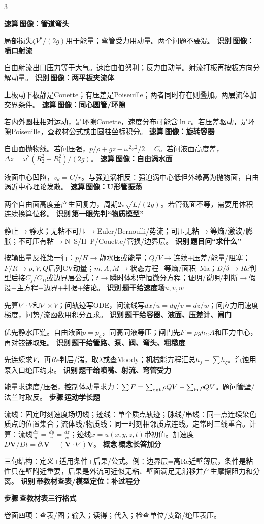 \documentclass[a4paper]{article}
\newcommand{\labtag}[3]{{\bfseries\color{#1}\colorbox{#1}{\color{white}\fontsize{2.35}{2.48}\selectfont #2}\,#3}\par}
\newcommand{\iden}[1]{\labtag{C}{识别}{#1}}
\newcommand{\step}[1]{\labtag{S}{步骤}{#1}}
\newcommand{\concept}[1]{\labtag{V}{概念}{#1}}
\newcommand{\idq}[1]{\iden{#1}}
\newcommand{\stepq}[1]{\step{#1}}
\newcommand{\conceptq}[1]{\concept{#1}}
\newcommand{\quickq}[1]{\labtag{F}{速算}{#1}}
\newenvironment{vfourWrap}{\par\begingroup\fontsize{2.68}{2.84}\selectfont\setlength{\fboxsep}{0.45pt}}{\par\endgroup}
\begin{document}
\begin{multicols}{3}
\begin{vfourWrap}
\quickq{图像：管道弯头}
局部损失$\zeta V^2/(2g)$用于能量；弯管受力用动量。两个问题不要混。
\idq{图像：喷口射流}
自由射流出口压力等于大气。速度由伯努利；反力由动量。射流打板再按板方向分解动量。
\idq{图像：两平板夹流体}
上板动下板静是Couette；有压差是Poiseuille；两者同时存在则叠加。两层流体加交界条件。
\quickq{图像：同心圆管/环隙}
若内外圆柱相对运动，是环隙Couette，速度分布可能含$\ln r$。若压差驱动，是环隙Poiseuille，查教材公式或由圆柱坐标积分。
\quickq{图像：旋转容器}
自由面抛物线。若问压强，$p/\rho+gz-\omega^2r^2/2=C$。若问液面高度差，$\Delta z=\omega^2(R_2^2-R_1^2)/(2g)$。
\quickq{图像：自由涡水面}
液面中心凹陷，$v_\theta=C/r$。与强迫涡相反：强迫涡中心低但外缘高为抛物面，自由涡近中心理论发散。
\quickq{图像：U形管振荡}
两个自由面高度差产生回复力，周期$2\pi\sqrt{L/(2g)}$。若管截面不等，需要用体积连续换算位移。
\idq{第一眼先判“物质模型”}
静止$\to$静水；无粘不可压$\to$Euler/Bernoulli/势流；可压无粘$\to$等熵/激波/膨胀；不可压有粘$\to$N--S/H--P/Couette/管损/边界层。
\idq{题目问“求什么”}
按输出量反推第一行：$p/H\to$静水压或能量；$Q/V\to$连续+压差/能量/阻塞；$F/R\to p,V,Q$后列CV动量；$\dot m,A,M\to$状态方程+等熵/面积--Ma；$D/\delta\to Re$判型后接$C_f/C_D$或边界层公式；$t\to$瞬时体积守恒微分方程；证明/说明/判断$\to$假设+主方程+边界+判据+结论。
\idq{题干给速度场$u,v,w$}
先算$\nabla\cdot V$和$\nabla\times V$；问轨迹写ODE，问流线写$dx/u=dy/v=dz/w$；问应力用速度梯度，问势/流函数用积分互求。
\idq{题干给容器、液面、压差计、闸门}
优先静水压链。自由液面$p=p_a$，同高同液等压；闸门先$F=\rho gh_CA$和压力中心，再对铰链取矩。
\idq{题干给管路、泵、阀、弯头、粗糙度}
先连续求$V$，再$Re$判层/湍，取$\lambda$或查Moody；机械能方程汇总$h_f+\sum h_\zeta$。汽蚀用泵入口绝压约束。
\idq{题干给喷嘴、射流、弯管受力}
能量求速度/压强，控制体动量求力：$\sum F=\sum_{\rm out}\rho QV-\sum_{\rm in}\rho QV$。题问管壁/法兰时取反。
\stepq{运动学长题}
流线：固定时刻速度场切线；迹线：单个质点轨迹；脉线/串线：同一点连续染色质点的位置集合；流体线/物质线：同一时刻相邻质点连线。定常时三线重合。计算：流线$\frac{dx}{u}=\frac{dy}{v}=\frac{dz}{w}$；迹线$\dot x=u(x,y,z,t)$带初值。加速度$D\bm V/Dt=\partial_t\bm V+(\bm V\cdot\nabla)\bm V$。
\conceptq{概念长答加分}
三句结构：定义+适用条件+后果/公式。例：边界层=高Re近壁薄层，条件是粘性只在壁附近重要，后果是外流可近似无粘、壁面满足无滑移并产生摩擦阻力和分离。
\idq{带教材查表/模型定位：补过程分}
\stepq{查教材表三行格式}
卷面四项：查\underline{\hspace{0.35cm}}表/图；输入\underline{\hspace{0.45cm}}；读得\underline{\hspace{0.45cm}}；代入\underline{\hspace{0.5cm}}；检查单位/支路/绝压表压。

\end{vfourWrap}
\end{multicols}
\end{document}
